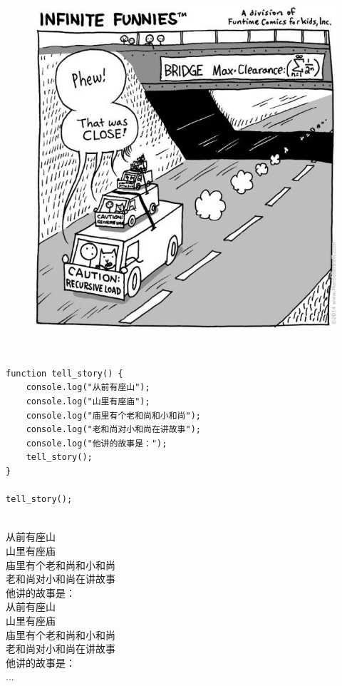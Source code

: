 \begin{figure}[H]
	\centering
	\includegraphics[scale=0.6]{img/C13/13-3/5.png}
\end{figure}

 \\

\begin{lstlisting}[style=htmlcssjs]
function tell_story() {
    console.log("从前有座山");
    console.log("山里有座庙");
    console.log("庙里有个老和尚和小和尚");
    console.log("老和尚对小和尚在讲故事");
    console.log("他讲的故事是：");
    tell_story();
}

tell_story();
\end{lstlisting}

\begin{tcolorbox}
	 \\
	从前有座山 \\
	山里有座庙 \\
	庙里有个老和尚和小和尚 \\
	老和尚对小和尚在讲故事 \\
	他讲的故事是： \\
	从前有座山 \\
	山里有座庙 \\
	庙里有个老和尚和小和尚 \\
	老和尚对小和尚在讲故事 \\
	他讲的故事是： \\
	...
\end{tcolorbox}

